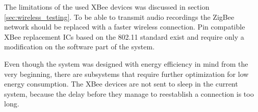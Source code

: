 The limitations of the used XBee devices was discussed in section \ref{sec:wireless_testing}. To be able to transmit audio recordings the ZigBee network should be replaced with a faster wireless connection. Pin compatible XBee replacement ICs based on the 802.11 standard exist and require only a modification on the software part of the system.

Even though the system was designed with energy efficiency in mind from the very beginning, there are subsystems that require further optimization for low energy consumption. The XBee devices are not sent to sleep in the current system, because the delay before they manage to reestablish a connection is too long.

